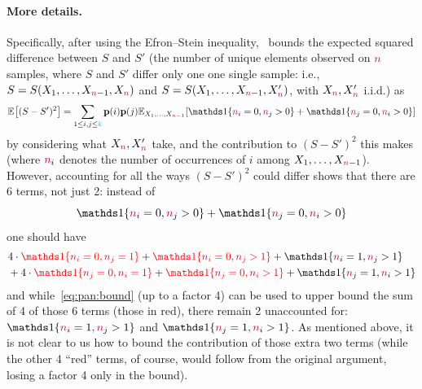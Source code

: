 \paragraph{More details.} Specifically, after using the Efron--Stein inequality,~\citet{Paninski08} bounds the expected squared difference between $S$ and $S'$ (the number of unique elements observed on ${\textcolor{purple}{n}}$ samples, where $S$ and $S'$ differ only one one single sample: i.e., $S=S(X_1,\dots,X_{{\textcolor{purple}{n}}-1}, X_{\textcolor{purple}{n}})$ and $S=S(X_1,\dots,X_{{\textcolor{purple}{n}}-1}, X'_{\textcolor{purple}{n}})$, with $X_{\textcolor{purple}{n}},X'_{\textcolor{purple}{n}}$ i.i.d.) as
\[
  \bEE{(S-S')^2} = \sum_{1\leq i,j\leq \ab} \p(i)\p(j) \bE{X_1,\dots,X_{\ns-1}}{ \indic{\ns_i=0, \ns_j>0} + \indic{\ns_j=0, \ns_i>0} }
\]
by considering what $X_{\textcolor{purple}{n}},X'_{\textcolor{purple}{n}}$ take, and the contribution to $(S-S')^2$ this makes (where ${\textcolor{purple}{n}}_i$ denotes the number of occurrences of $i$ among $X_1,\dots,X_{{\textcolor{purple}{n}}-1}$).
However, accounting for all the ways $(S-S')^2$ could differ shows that there are 6 terms, not just 2: instead of 
\begin{equation}
  \label{eq:pan:bound}
\indic{\ns_i=0, \ns_j>0} + \indic{\ns_j=0, \ns_i>0} 
\end{equation}
one should have
\begin{align*}
& 4\cdot \textcolor{red}{\indic{\ns_i=0, \ns_j=1}} + \textcolor{red}{\indic{\ns_i=0, \ns_j>1}} + \indic{\ns_i=1, \ns_j>1} \\
&+ 4\cdot \textcolor{red}{\indic{\ns_j=0, \ns_i=1}} + \textcolor{red}{\indic{\ns_j=0, \ns_i>1}} + \indic{\ns_j=1, \ns_i>1} 
\end{align*}
and while~\eqref{eq:pan:bound} (up to a factor 4) can be used to upper bound the sum of 4 of those 6 terms (those in red), there remain 2 unaccounted for:
$
\indic{\ns_i=1, \ns_j>1}
$
and 
$
\indic{\ns_j=1, \ns_i>1}
$. As mentioned above, it is not clear to us how to bound the contribution of those extra two terms (while the other 4 ``red'' terms, of course, would follow from the original argument, losing a factor 4 only in the bound).
\egroup

